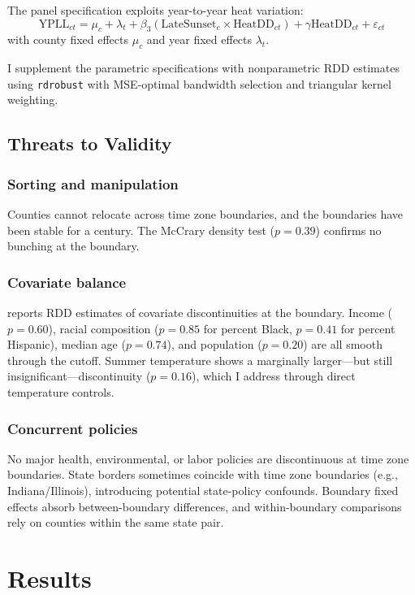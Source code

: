 \documentclass[12pt]{article}
\begin{document}
The panel specification exploits year-to-year heat variation:
\begin{equation}
\text{YPLL}_{ct} = \mu_c + \lambda_t + \beta_3 (\text{LateSunset}_c \times \text{HeatDD}_{ct}) + \gamma \text{HeatDD}_{ct} + \varepsilon_{ct}
\end{equation}
with county fixed effects $\mu_c$ and year fixed effects $\lambda_t$.

I supplement the parametric specifications with nonparametric RDD estimates using \texttt{rdrobust} \citep{cattaneo2020practical} with MSE-optimal bandwidth selection and triangular kernel weighting.

\subsection{Threats to Validity}

\subsubsection*{Sorting and manipulation} Counties cannot relocate across time zone boundaries, and the boundaries have been stable for a century. The McCrary density test ($p = 0.39$) confirms no bunching at the boundary.

\subsubsection*{Covariate balance}  reports RDD estimates of covariate discontinuities at the boundary. Income ($p = 0.60$), racial composition ($p = 0.85$ for percent Black, $p = 0.41$ for percent Hispanic), median age ($p = 0.74$), and population ($p = 0.20$) are all smooth through the cutoff. Summer temperature shows a marginally larger---but still insignificant---discontinuity ($p = 0.16$), which I address through direct temperature controls.

\subsubsection*{Concurrent policies} No major health, environmental, or labor policies are discontinuous at time zone boundaries. State borders sometimes coincide with time zone boundaries (e.g., Indiana/Illinois), introducing potential state-policy confounds. Boundary fixed effects absorb between-boundary differences, and within-boundary comparisons rely on counties within the same state pair.


\section{Results}
\label{sec:results}
\end{document}
